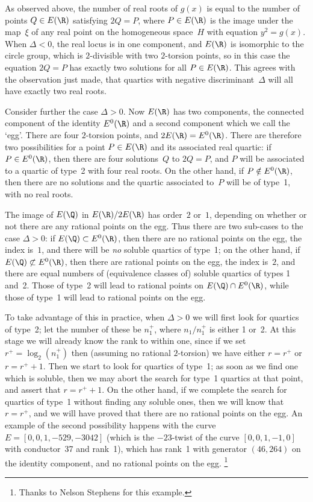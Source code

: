 As observed above, the number of real roots of $g(x)$ is equal to the
number of points $Q\in E(\R)$ satisfying $2Q=P$, where $P\in E(\R)$ is
the image under the map~$\xi$ of any real point on the homogeneous
space~$H$ with equation $y^2=g(x)$.  When $\Delta<0$, the real locus
is in one component, and $E(\R)$ is isomorphic to the circle group,
which is $2$-divisible with two $2$-torsion points, so in this case
the equation $2Q=P$ has exactly two solutions for all $P\in E(\R)$.
This agrees with the observation just made, that quartics with
negative discriminant~$\Delta$ will all have exactly two real roots.

Consider further the case $\Delta>0$.  Now $E(\R)$ has two components,
the connected component of the identity $E^0(\R)$ and a second
component which we call the `egg'.  There are four $2$-torsion
points, and $2E(\R) = E^0(\R)$.  There are therefore two possibilities
for a point $P\in E(\R)$ and its associated real quartic: if $P\in
E^0(\R)$, then there are four solutions~$Q$ to $2Q=P$, and $P$ will be
associated to a quartic of type~2 with four real roots.  On the other
hand, if $P\notin E^0(\R)$, then there are no solutions and the
quartic associated to~$P$ will be of type~1, with no real roots.

The image of $E(\Q)$ in $E(\R)/2E(\R)$ has order~$2$ or~$1$, depending
on whether or not there are any rational points on the egg.  Thus
there are two sub-cases to the case $\Delta>0$: if $E(\Q)\subset
E^0(\R)$, then there are no rational points on the egg, the index
is~$1$, and there will be {\it no\/} soluble quartics of type~1; on
the other hand, if $E(\Q)\not\subset E^0(\R)$, then there are rational
points on the egg, the index is~$2$, and there are equal numbers of
(equivalence classes of) soluble quartics of types 1 and~2.  Those of
type~2 will lead to rational points on $E(\Q)\cap E^0(\R)$, while
those of type~1 will lead to rational points on the egg.

To take advantage of this in practice, when $\Delta>0$ we will first
look for quartics of type~2; let the number of these be $n_1^+$, where
$n_1/n_1^+$ is either 1 or~2.  At this stage we will already know the
rank to within one, since if we set $r^+=\log_2(n_1^+)$ then (assuming
no rational $2$-torsion) we have either $r=r^+$ or $r=r^++1$.  Then we
start to look for quartics of type~1; as soon as we find one which is
soluble, then we may abort the search for type~1 quartics at that
point, and assert that $r=r^++1$.  On the other hand, if we complete
the search for quartics of type~1 without finding any soluble ones,
then we will know that $r=r^+$, and we will have proved that there are
no rational points on the egg.  An example of the second possibility
happens with the curve $E=[0,0,1,-529,-3042]$ (which is the
$-23$-twist of the curve $[0,0,1,-1,0]$ with conductor~37 and rank~1),
which has rank~1 with generator $(46,264)$ on the identity component,
and no rational points on the egg.%
\footnote{Thanks to Nelson Stephens for this example.}

